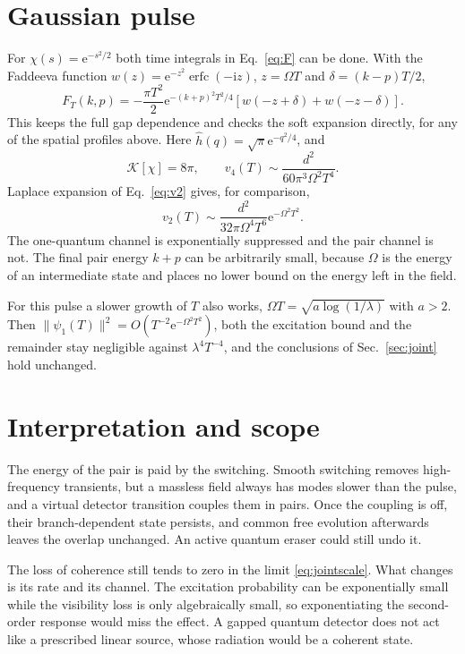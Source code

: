 \documentclass[11pt,a4paper]{article}
\newcommand{\ii}{\mathrm{i}}
\newcommand{\ee}{\mathrm{e}}
\newcommand{\cK}{\mathcal{K}}
\begin{document}
\section{Gaussian pulse}
\label{sec:gauss}

For $\chi(s)=\ee^{-s^2/2}$ both time integrals in Eq.~\eqref{eq:F} can be done. With the Faddeeva function $w(z)=\ee^{-z^2}\operatorname{erfc}(-\ii z)$, $z=\Omega T$ and $\delta=(k-p)T/2$,
\begin{equation}
 F_T(k,p)=-\frac{\pi T^2}{2}\ee^{-(k+p)^2T^2/4}
 [w(-z+\delta)+w(-z-\delta)].\label{eq:gaussianF}
\end{equation}
This keeps the full gap dependence and checks the soft expansion directly, for any of the spatial profiles above. Here $\widehat h(q)=\sqrt\pi\ee^{-q^2/4}$, and
\begin{equation}
 \cK[\chi]=8\pi,\qquad
 v_4(T)\sim\frac{d^2}{60\pi^3\Omega^2T^4}.\label{eq:gauss4}
\end{equation}
Laplace expansion of Eq.~\eqref{eq:v2} gives, for comparison,
\begin{equation}
 v_2(T)\sim\frac{d^2}{32\pi\Omega^4T^6}\ee^{-\Omega^2T^2}.
 \label{eq:gauss2}
\end{equation}
The one-quantum channel is exponentially suppressed and the pair channel is not. The final pair energy $k+p$ can be arbitrarily small, because $\Omega$ is the energy of an intermediate state and places no lower bound on the energy left in the field.

For this pulse a slower growth of $T$ also works, $\Omega T=\sqrt{a\log(1/\lambda)}$ with $a>2$. Then $\|\psi_1(T)\|^2=O(T^{-2}\ee^{-\Omega^2T^2})$, both the excitation bound and the remainder stay negligible against $\lambda^4T^{-4}$, and the conclusions of Sec.~\ref{sec:joint} hold unchanged.

\section{Interpretation and scope}

The energy of the pair is paid by the switching. Smooth switching removes high-frequency transients, but a massless field always has modes slower than the pulse, and a virtual detector transition couples them in pairs. Once the coupling is off, their branch-dependent state persists, and common free evolution afterwards leaves the overlap unchanged. An active quantum eraser could still undo it.

The loss of coherence still tends to zero in the limit \eqref{eq:jointscale}. What changes is its rate and its channel. The excitation probability can be exponentially small while the visibility loss is only algebraically small, so exponentiating the second-order response would miss the effect. A gapped quantum detector does not act like a prescribed linear source, whose radiation would be a coherent state.
\end{document}
